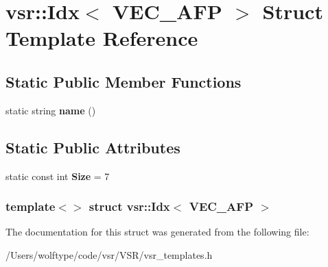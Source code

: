 \hypertarget{structvsr_1_1_idx_3_01_v_e_c___a_f_p_01_4}{\section{vsr\-:\-:Idx$<$ V\-E\-C\-\_\-\-A\-F\-P $>$ Struct Template Reference}
\label{structvsr_1_1_idx_3_01_v_e_c___a_f_p_01_4}
}
\subsection*{Static Public Member Functions}
\begin{DoxyCompactItemize}
\item 
\hypertarget{structvsr_1_1_idx_3_01_v_e_c___a_f_p_01_4_ae891f976d84186777173ae1fc1c8f4e2}{static string {\bfseries name} ()}\label{structvsr_1_1_idx_3_01_v_e_c___a_f_p_01_4_ae891f976d84186777173ae1fc1c8f4e2}

\end{DoxyCompactItemize}
\subsection*{Static Public Attributes}
\begin{DoxyCompactItemize}
\item 
\hypertarget{structvsr_1_1_idx_3_01_v_e_c___a_f_p_01_4_a7b87b18aaac193a37cbf10640f42c8d9}{static const int {\bfseries Size} = 7}\label{structvsr_1_1_idx_3_01_v_e_c___a_f_p_01_4_a7b87b18aaac193a37cbf10640f42c8d9}

\end{DoxyCompactItemize}
\subsubsection*{template$<$$>$ struct vsr\-::\-Idx$<$ V\-E\-C\-\_\-\-A\-F\-P $>$}



The documentation for this struct was generated from the following file\-:\begin{DoxyCompactItemize}
\item 
/\-Users/wolftype/code/vsr/\-V\-S\-R/vsr\-\_\-templates.\-h\end{DoxyCompactItemize}
